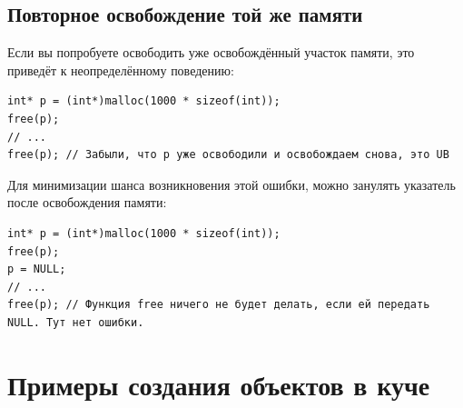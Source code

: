 \documentclass{article}
\begin{document}
\subsection*{Повторное освобождение той же памяти}
Если вы попробуете освободить уже освобождённый участок памяти, это приведёт к неопределённому поведению:
\begin{lstlisting}
int* p = (int*)malloc(1000 * sizeof(int));
free(p);
// ...
free(p); // Забыли, что p уже освободили и освобождаем снова, это UB
\end{lstlisting}
Для минимизации шанса возникновения этой ошибки, можно занулять указатель после освобождения памяти:
\begin{lstlisting}
int* p = (int*)malloc(1000 * sizeof(int));
free(p);
p = NULL;
// ...
free(p); // Функция free ничего не будет делать, если ей передать NULL. Тут нет ошибки.
\end{lstlisting}


\section*{Примеры создания объектов в куче}
\end{document}
